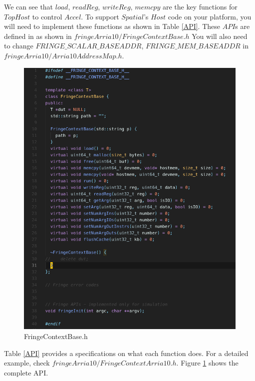\documentclass{article}
\begin{document}
We can see that $load$, $readReg$, $writeReg$, $memcpy$ are the key functions for $TopHost$ to control $Accel$.
To support $Spatial$'s $Host$ code on your platform, you will need to implement these functions as shown in Table \ref{API}.
These $API$s are defined in as shown in $fringeArria10/FringeContextBase.h$
You will also need to change $FRINGE\_SCALAR\_BASEADDR$, $FRINGE\_MEM\_BASEADDR$ in $fringeArria10/Arria10AddressMap.h$.

\begin{figure}
\centering
\includegraphics[scale=0.45]{fringecontext.png}
\caption{FringeContextBase.h}
\label{fig:fringecontextbase}
\end{figure}

Table \ref{API} provides a specifications on what each function does.
For a detailed example, check $fringeArria10/FringeContextArria10.h$.
Figure \ref{fig:fringecontextbase} shows the complete API.
\end{document}

